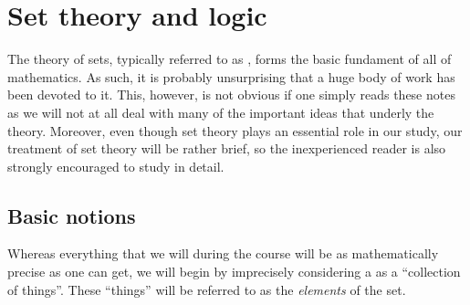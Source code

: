 \section{Set theory and logic}
\label{set-theory}
The theory of sets, typically referred to as , forms the basic fundament of all of mathematics. As such, it is probably unsurprising that a huge body of work has been devoted to it. This, however, is not obvious if one simply reads these notes as we will not at all deal with many of the important ideas that underly the theory. Moreover, even though set theory plays an essential role in our study, our treatment of set theory will be rather brief, so the inexperienced reader is also strongly encouraged to study \cite[\S1]{Mun} in detail.

\subsection{Basic notions}
Whereas everything that we will during the course will be as mathematically precise as one can get, we will begin by imprecisely considering a  as a ``collection of things''. These ``things'' will be referred to as the \emph{elements} of the set.

